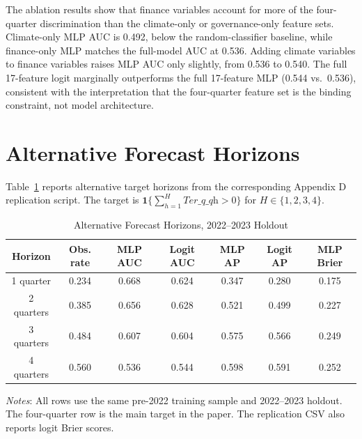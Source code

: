 \documentclass[12pt]{article}
\begin{document}
The ablation results show that finance variables account for more of the
four-quarter discrimination than the climate-only or governance-only feature
sets.  Climate-only MLP AUC is 0.492, below the random-classifier baseline,
while finance-only MLP matches the full-model AUC at 0.536.  Adding climate
variables to finance variables raises MLP AUC only slightly, from 0.536 to
0.540.  The full 17-feature logit marginally outperforms the full 17-feature
MLP (0.544 vs.\ 0.536), consistent with the interpretation that the
four-quarter feature set is the binding constraint, not model architecture.

\section{Alternative Forecast Horizons}\label{app:horizons}

Table~\ref{tab:appendix_horizons} reports alternative target horizons from
the corresponding Appendix D replication script.  The target is
$\mathbf{1}\{\sum_{h=1}^{H}\textit{Ter\_q\_qh} > 0\}$ for
$H \in \{1,2,3,4\}$.

\begin{table}[H]
\centering
\caption{Alternative Forecast Horizons, 2022--2023 Holdout}\label{tab:appendix_horizons}
\begin{threeparttable}
\small
\begin{tabular}{ccccccc}
\toprule
Horizon & Obs. rate & MLP AUC & Logit AUC & MLP AP & Logit AP & MLP Brier \\
\midrule
1 quarter  & 0.234 & 0.668 & 0.624 & 0.347 & 0.280 & 0.175 \\
2 quarters & 0.385 & 0.656 & 0.628 & 0.521 & 0.499 & 0.227 \\
3 quarters & 0.484 & 0.607 & 0.604 & 0.575 & 0.566 & 0.249 \\
4 quarters & 0.560 & 0.536 & 0.544 & 0.598 & 0.591 & 0.252 \\
\bottomrule
\end{tabular}
\begin{tablenotes}
  \small
  \item \textit{Notes}: All rows use the same pre-2022 training sample and
  2022--2023 holdout.  The four-quarter row is the main target in the paper.
  The replication CSV also reports logit Brier scores.
\end{tablenotes}
\end{threeparttable}
\end{table}
\end{document}
